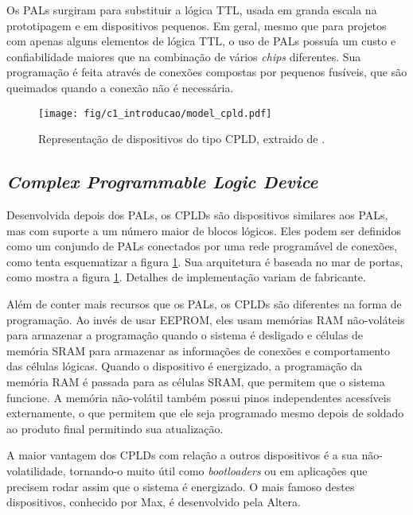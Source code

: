 \documentclass[11pt,a4paper,oneside]{book}
\begin{document}
Os PALs surgiram para substituir a l\'ogica TTL, usada em granda escala na prototipagem e em dispositivos pequenos.
Em geral, mesmo que para projetos com apenas alguns elementos de l\'ogica TTL, o uso de PALs possu\'i­a um custo e confiabilidade maiores que na combina\c{c}\~ao de v\'arios \textit{chips} diferentes.
Sua programa\c{c}\~ao \'e feita atrav\'es de conex\~oes compostas por pequenos fus\'i­veis, que s\~ao queimados quando a conex\~ao n\~ao \'e necess\'aria.

\begin{figure}[h]
\centering
\texttt{[image: fig/c1\_introducao/model\_cpld.pdf]}
\caption{Representa\c{c}\~ao de dispositivos do tipo CPLD, extraido de \cite{Ashenden2008}.}
\label{fig:cpld}
\end{figure}

\subsection{\textit{Complex Programmable Logic Device}}
Desenvolvida depois dos PALs, os CPLDs s\~ao dispositivos similares aos PALs, mas com suporte a um n\'umero maior de blocos l\'ogicos.
Eles podem ser definidos como um conjundo de PALs conectados por uma rede program\'avel de conex\~oes, como tenta esquematizar a figura \ref{fig:cpld}.
Sua arquitetura \'e baseada no mar de portas, como mostra a figura \ref{fig:cpld}.
Detalhes de implementa\c{c}\~ao variam de fabricante.

Al\'em de conter mais recursos que os PALs, os CPLDs s\~ao diferentes na forma de programa\c{c}\~ao.
Ao inv\'es de usar EEPROM, eles usam mem\'orias RAM n\~ao-vol\'ateis para armazenar a programa\c{c}\~ao quando o sistema \'e desligado e c\'elulas de mem\'oria SRAM para armazenar as informa\c{c}\~oes de conex\~oes e comportamento das c\'elulas l\'ogicas.
Quando o dispositivo \'e energizado, a programa\c{c}\~ao da mem\'oria RAM \'e passada para as c\'elulas SRAM, que permitem que o sistema funcione.
A mem\'oria n\~ao-vol\'atil tamb\'em possui pinos independentes acess\'i­veis externamente, o que permitem que ele seja programado mesmo depois de soldado ao produto final permitindo sua atualiza\c{c}\~ao.

A maior vantagem dos CPLDs com rela\c{c}\~ao a outros dispositivos \'e a sua n\~ao-volatilidade, tornando-o muito \'util como \textit{bootloaders} ou em aplica\c{c}\~oes que precisem rodar assim que o sistema \'e energizado.
O mais famoso destes dispositivos, conhecido por Max, \'e desenvolvido pela Altera.
\end{document}
